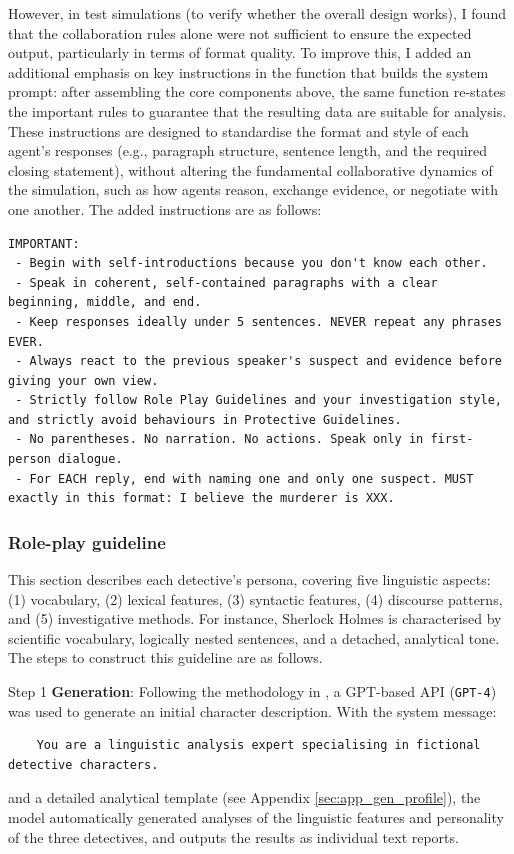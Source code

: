 \documentclass{article}
\begin{document}
However, in test simulations (to verify whether the overall design works), I found that the collaboration rules alone were not sufficient to ensure the expected output, particularly in terms of format quality. To improve this, I added an additional emphasis on key instructions in the function that builds the system prompt: after assembling the core components above, the same function re-states the important rules to guarantee that the resulting data are suitable for analysis. These instructions are designed to standardise the format and style of each agent's responses (e.g., paragraph structure, sentence length, and the required closing statement), without altering the fundamental collaborative dynamics of the simulation, such as how agents reason, exchange evidence, or negotiate with one another. The added instructions are as follows:
\begin{verbatim}
IMPORTANT:
 - Begin with self-introductions because you don't know each other.
 - Speak in coherent, self-contained paragraphs with a clear beginning, middle, and end.
 - Keep responses ideally under 5 sentences. NEVER repeat any phrases EVER.
 - Always react to the previous speaker's suspect and evidence before giving your own view.
 - Strictly follow Role Play Guidelines and your investigation style, and strictly avoid behaviours in Protective Guidelines.
 - No parentheses. No narration. No actions. Speak only in first-person dialogue.
 - For EACH reply, end with naming one and only one suspect. MUST exactly in this format: I believe the murderer is XXX.
\end{verbatim}

\subsubsection{Role-play guideline} \label{sec:methods_prompt_person}

This section describes each detective's persona, covering five linguistic aspects: (1) vocabulary, (2) lexical features, (3) syntactic features, (4) discourse patterns, and (5) investigative methods. For instance, Sherlock Holmes is characterised by scientific vocabulary, logically nested sentences, and a detached, analytical tone. The steps to construct this guideline are as follows.

Step 1 \textbf{Generation}: Following the methodology in \citet{delima2025detective}, a GPT-based API (\texttt{GPT-4}) was used to generate an initial character description. With the system message:
\begin{verbatim}
    You are a linguistic analysis expert specialising in fictional detective characters.
\end{verbatim}
and a detailed analytical template (see Appendix \ref{sec:app_gen_profile}), the model automatically generated analyses of the linguistic features and personality of the three detectives, and outputs the results as individual text reports. 
\end{document}

